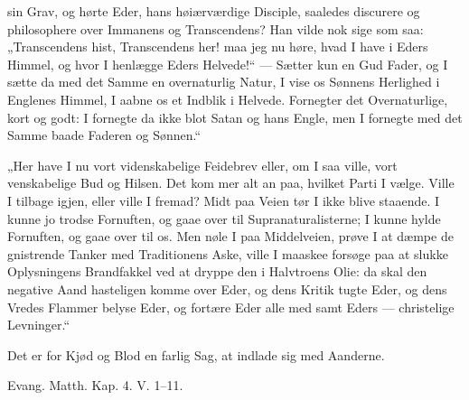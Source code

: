 \documentclass[12pt,a4paper]{book}
\begin{document}
sin Grav, og hørte Eder, hans høiærværdige Disciple, saaledes discurere og philosophere
over Immanens og Transcendens? Han vilde nok sige som saa: „Transcendens hist,
Transcendens her! maa jeg nu høre, hvad I have i Eders Himmel, og hvor I henlægge Eders
Helvede!“ --- Sætter kun en Gud Fader, og I sætte da med det Samme en overnaturlig Natur,
I vise os Sønnens Herlighed i Englenes Himmel, I aabne os et Indblik i Helvede. Fornegter
det Overnaturlige, kort og godt: I fornegte da ikke blot Satan og hans Engle, men I
fornegte med det Samme baade Faderen og Sønnen.“

„Her have I nu vort videnskabelige Feidebrev eller, om I saa ville, vort venskabelige Bud
og Hilsen. Det kom\-%
mer alt an paa, hvilket Parti I vælge. Ville I tilbage igjen, eller ville I fremad? Midt
paa Veien tør I ikke blive staaende. I kunne jo trodse Fornuften, og gaae over til
Supranaturalisterne; I kunne hylde Fornuften, og gaae over til os. Men nøle I paa
Middelveien, prøve I at dæmpe de gnistrende Tanker med Traditionens Aske, ville I maaskee
forsøge paa at slukke Oplysningens Brandfakkel ved at dryppe den i Halvtroens Olie: da
skal den negative Aand hasteligen komme over Eder, og dens Kritik tugte Eder, og dens
Vredes Flammer belyse Eder, og fortære Eder alle med samt Eders --- christelige
Levninger.“

Det er for Kjød og Blod en farlig Sag, at indlade sig med Aanderne.

{\small Evang. Matth. Kap. 4. V. 1--11.}
\end{document}
